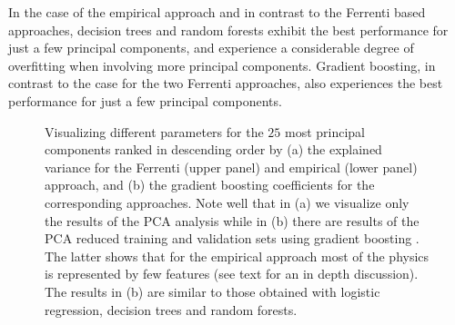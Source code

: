 \documentclass[superscriptaddress,unsortedaddress,
 amsmath,amssymb,
 aps,
]{revtex4-2}
\begin{document}
In the case of the empirical approach and in contrast to the Ferrenti based approaches, decision trees and random forests exhibit the best performance for just a few principal components, and experience a considerable degree of overfitting 
when involving more principal components. Gradient boosting, in contrast to the case for the two Ferrenti  approaches, also experiences the best performance for just a few principal components. 
\begin{figure}[ht]
    \centering
    \begin{subfigure}[b]{0.45\textwidth}
        
        \label{fig:01-fi-e}
    \end{subfigure}
    \begin{subfigure}[b]{0.45\textwidth}
        
        \label{fig:01-fi-d}
    \end{subfigure}%
    \hfill
    \begin{subfigure}[b]{0.45\textwidth}
        
        \label{fig:03-fi-e}
        \subcaption{}
    \end{subfigure}
    \begin{subfigure}[b]{0.45\textwidth}
        
        \label{fig:03-fi-d}
        \subcaption{}
    \end{subfigure}
    \caption{Visualizing different parameters for the $25$ most principal components ranked in descending order by (a) the explained variance for the Ferrenti (upper panel) and empirical (lower panel) approach, and (b) the gradient boosting coefficients for the corresponding approaches. Note well that in (a) we visualize only the results of the PCA analysis while in (b) there are results of the PCA reduced training and validation sets using gradient boosting \cite{Hastie2009,xgboost2016}. The latter shows that for the empirical approach most of the physics is represented by few features (see text for an in depth discussion). The results in (b) are similar to those obtained with logistic regression, decision trees and random forests.  
    }
    \label{fig:PComponents}
\end{figure}
\end{document}
